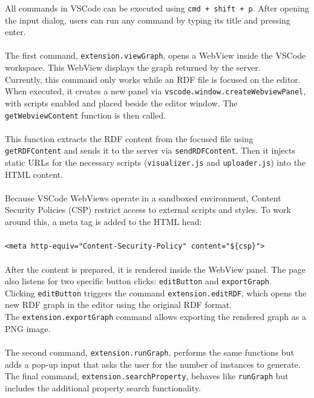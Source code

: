 All commands in VSCode can be executed using \texttt{cmd + shift + p}. After opening the input dialog, users can run any command by typing its title and pressing enter.
\\
\\
The first command, \texttt{extension.viewGraph}, opens a WebView inside the VSCode workspace. This WebView displays the graph returned by the server.
\\
Currently, this command only works while an RDF file is focused on the editor. When executed, it creates a new panel via \texttt{vscode.window.createWebviewPanel}, with scripts enabled and placed beside the editor window. The \texttt{getWebviewContent} function is then called.
\\
\\
This function extracts the RDF content from the focused file using \texttt{getRDFContent} and sends it to the server via \texttt{sendRDFContent}. Then it injects static URLs for the necessary scripts (\texttt{visualizer.js} and \texttt{uploader.js}) into the HTML content.
\\
\\
Because VSCode WebViews operate in a sandboxed environment, Content Security Policies (CSP) restrict access to external scripts and styles. To work around this, a meta tag is added to the HTML head:
\\
\\
\texttt{<meta http-equiv="Content-Security-Policy" content="\$\{csp\}">}
\\
\\
After the content is prepared, it is rendered inside the WebView panel. The page also listens for two specific button clicks: \texttt{editButton} and \texttt{exportGraph}.
\\
Clicking \texttt{editButton} triggers the command \texttt{extension.editRDF}, which opens the new RDF graph in the editor using the original RDF format.
\\
The \texttt{extension.exportGraph} command allows exporting the rendered graph as a PNG image.
\\
\\
The second command, \texttt{extension.runGraph}, performs the same functions but adds a pop-up input that asks the user for the number of instances to generate.
\\
The final command, \texttt{extension.searchProperty}, behaves like \texttt{runGraph} but includes the additional property search functionality.

